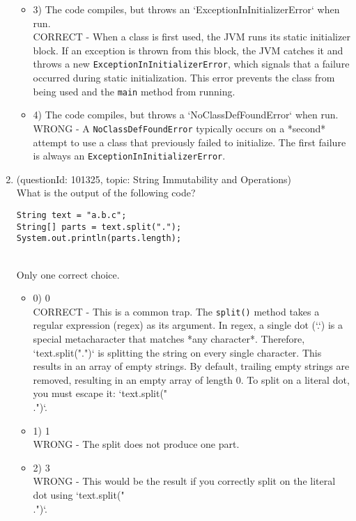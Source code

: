 \documentclass[12pt]{article}
\begin{document}
\begin{enumerate}[label=(\arabic*)]
\begin{itemize}
\item 3) The code compiles, but throws an `ExceptionInInitializerError` when run.
 \\ 
CORRECT - When a class is first used, the JVM runs its static initializer block. If an exception is thrown from this block, the JVM catches it and throws a new \verb|ExceptionInInitializerError|, which signals that a failure occurred during static initialization. This error prevents the class from being used and the \verb|main| method from running.

\item 4) The code compiles, but throws a `NoClassDefFoundError` when run.
 \\ 
WRONG - A \verb|NoClassDefFoundError| typically occurs on a *second* attempt to use a class that previously failed to initialize. The first failure is always an \verb|ExceptionInInitializerError|.

\end{itemize}
\item (questionId: 101325, topic: String Immutability and Operations) \\ 
What is the output of the following code?
\begin{verbatim}
String text = "a.b.c";
String[] parts = text.split(".");
System.out.println(parts.length);
\end{verbatim}
\\ \noindent Only one correct choice. 
\begin{itemize}
\item 0) 0
 \\ 
CORRECT - This is a common trap. The \verb|split()| method takes a regular expression (regex) as its argument. In regex, a single dot (`.`) is a special metacharacter that matches *any character*. Therefore, `text.split(".")` is splitting the string on every single character. This results in an array of empty strings. By default, trailing empty strings are removed, resulting in an empty array of length 0. To split on a literal dot, you must escape it: `text.split("\\.")`.

\item 1) 1
 \\ 
WRONG - The split does not produce one part.

\item 2) 3
 \\ 
WRONG - This would be the result if you correctly split on the literal dot using `text.split("\\.")`.


\end{itemize}
\end{enumerate}
\end{document}
